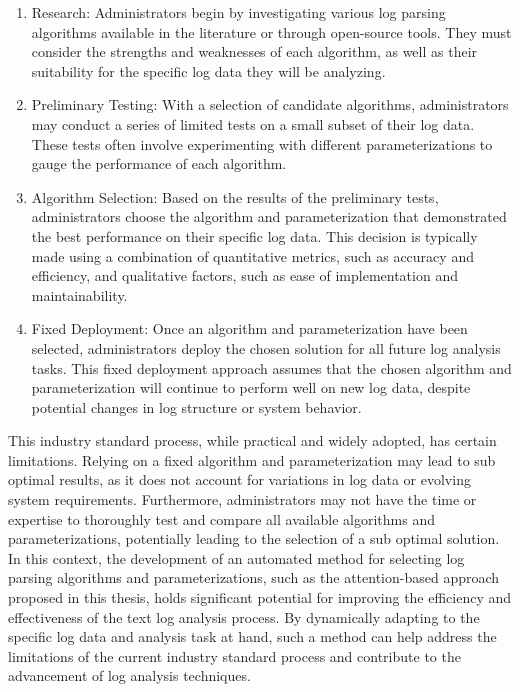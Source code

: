 \begin{enumerate}
    \item    Research: Administrators begin by investigating various log parsing algorithms available in the literature or through open-source tools. They must consider the strengths and weaknesses of each algorithm, as well as their suitability for the specific log data they will be analyzing.

    \item    Preliminary Testing: With a selection of candidate algorithms, administrators may conduct a series of limited tests on a small subset of their log data. These tests often involve experimenting with different parameterizations to gauge the performance of each algorithm.

    \item  Algorithm Selection: Based on the results of the preliminary tests, administrators choose the algorithm and parameterization that demonstrated the best performance on their specific log data. This decision is typically made using a combination of quantitative metrics, such as accuracy and efficiency, and qualitative factors, such as ease of implementation and maintainability.

    \item  Fixed Deployment: Once an algorithm and parameterization have been selected, administrators deploy the chosen solution for all future log analysis tasks. This fixed deployment approach assumes that the chosen algorithm and parameterization will continue to perform well on new log data, despite potential changes in log structure or system behavior.
\end{enumerate}
This industry standard process, while practical and widely adopted, has certain limitations. Relying on a fixed algorithm and parameterization may lead to sub optimal results, as it does not account for variations in log data or evolving system requirements. Furthermore, administrators may not have the time or expertise to thoroughly test and compare all available algorithms and parameterizations, potentially leading to the selection of a sub optimal solution.\\

In this context, the development of an automated method for selecting log parsing algorithms and parameterizations, such as the attention-based approach proposed in this thesis, holds significant potential for improving the efficiency and effectiveness of the text log analysis process. By dynamically adapting to the specific log data and analysis task at hand, such a method can help address the limitations of the current industry standard process and contribute to the advancement of log analysis techniques.\\

